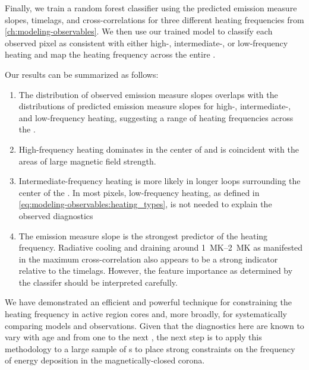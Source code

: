 Finally, we train a random forest classifier using the predicted emission measure slopes, timelags, and cross-correlations for three different heating frequencies from \autoref{ch:modeling-observables}. We then use our trained model to classify each observed pixel as consistent with either high-, intermediate-, or low-frequency heating and map the heating frequency across the entire \AR{}.

Our results can be summarized as follows:
\begin{enumerate}
    \item The distribution of observed emission measure slopes overlaps with the distributions of predicted emission measure slopes for high-, intermediate-, and low-frequency heating, suggesting a range of heating frequencies across the \AR{}.
    \item High-frequency heating dominates in the center of \AR{} and is coincident with the areas of large magnetic field strength.
    \item Intermediate-frequency heating is more likely in longer loops surrounding the center of the \AR{}. In most pixels, low-frequency heating, as defined in \autoref{eq:modeling-observables:heating_types}, is not needed to explain the observed diagnostics
    \item The emission measure slope is the strongest predictor of the heating frequency. Radiative cooling and draining around \SIrange{1}{2}{\mega\kelvin} as manifested in the maximum cross-correlation also appears to be a strong indicator relative to the timelags. However, the feature importance as determined by the classifer should be interpreted carefully.
\end{enumerate}

We have demonstrated an efficient and powerful technique for constraining the heating frequency in active region cores and, more broadly, for systematically comparing models and observations. Given that the diagnostics here are known to vary with age \citep[e.g.][]{schmelz_cold_2012,del_zanna_evolution_2015} and from one \AR{} to the next \citep{warren_systematic_2012,viall_survey_2017}, the next step is to apply this methodology to a large sample of \AR s to place strong constraints on the frequency of energy deposition in the magnetically-closed corona.
